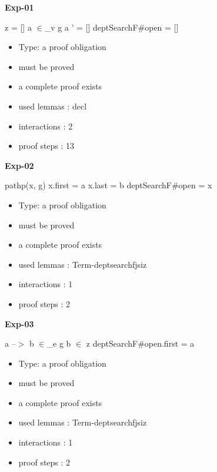 \documentclass[a4paper]{article}
\begin{document}
\medskip

{\LARGE\bf Exp-01}\label{lemma-Exp-01}

\medskip

 \Fol z = [] \And a $\in$\_v g \Or a ' = [] \Imp \Do deptSearchF\#\Dc open = []

\begin{itemize}

\item Type: a proof obligation

\item       must be proved
\item       a complete proof exists
\item       used lemmas  : decl
\item       interactions : 2
\item       proof steps  : 13
\end{itemize}

\medskip

{\LARGE\bf Exp-02}\label{lemma-Exp-02}

\medskip

 \Fol pathp(x, g) \And x.first = a \And x.last = b \Imp \Do deptSearchF\#\Dc open = x

\begin{itemize}

\item Type: a proof obligation

\item       must be proved
\item       a complete proof exists
\item       used lemmas  : Term-deptsearchfjsiz
\item       interactions : 1
\item       proof steps  : 2
\end{itemize}

\medskip

{\LARGE\bf Exp-03}\label{lemma-Exp-03}

\medskip

 \Fol a --$>$ b $\in$\_e g \And b $\in$ z \Imp \Do deptSearchF\#\Dc open.first = a

\begin{itemize}

\item Type: a proof obligation

\item       must be proved
\item       a complete proof exists
\item       used lemmas  : Term-deptsearchfjsiz
\item       interactions : 1
\item       proof steps  : 2
\end{itemize}
\end{document}

